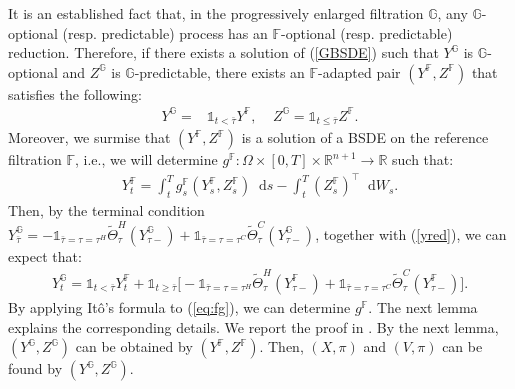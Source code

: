 \documentclass[a4paper, 11pt]{article}              %
\numberwithin{equation}{section}
\theoremstyle{plain}
\newcommand{\btau}{\bar{\tau}}
\newcommand{\1}{\mathds{1}}
\newcommand{\dsF}{\mathbb{F}}
\newcommand{\dsR}{\mathbb{R}}
\newcommand{\dsG}{\mathbb{G}}
\newcommand{\Jt}{\tilde{\Theta}}
\theoremstyle{plain}
\theoremstyle{definition}
\theoremstyle{plain}
\newcommand*\df{\mathop{}\!\mathrm{d}}
\begin{document}
It is an established fact that, in the progressively enlarged filtration $\dsG$, any
$\dsG$-optional (resp. predictable) process has an $\dsF$-optional
(resp. predictable) reduction. Therefore, if there exists a solution of
(\ref{GBSDE}) such that $Y^\dsG$ is $\dsG$-optional and $Z^\dsG$ is
$\dsG$-predictable, there exists an $\dsF$-adapted pair $(Y^\dsF, Z^\dsF)$
that satisfies the following:
\begin{align}
 Y^\dsG =& \1_{t< \btau}Y^\dsF, ~~~~~Z^\dsG = \1_{t \leq \btau}Z^\dsF.\label{yred}  
\end{align}
Moreover, we surmise that $(Y^\dsF, Z^\dsF)$ is a solution of a BSDE on the
reference filtration $\dsF$, i.e., we will determine $g^\dsF \colon \Omega \times [0, T] \times
\dsR^{n+1}\to \dsR$ such that:
\begin{align}
 Y^{\dsF}_t = \int_{t}^{T}g^{\dsF}_s(Y^{\dsF}_s, Z^{\dsF}_s) \df s - \int_{t}^{T}(Z^{\dsF}_s)^{\top}
  \df W_s. \label{FBSDE}
\end{align}
Then, by the terminal condition
$Y^\dsG_{\btau} =
-\1_{\btau=\tau=\tau^H}\Jt^{  H}_{\tau}(Y^{\dsG}_{\tau-})+\1_{\btau=\tau=\tau^C}\Jt^{ C}_{\tau}(Y^{\dsG}_{\tau-})$,
together with (\ref{yred}), 
we can expect that:
\begin{align}
  Y^{\dsG}_t = \1_{t <\btau}Y^{\dsF}_t + \1_{t \geq \btau}
  \big[-\1_{\btau=\tau=\tau^H}\Jt^{ H}_{\tau}(Y^{\dsF}_{\tau-})+\1_{\btau=\tau=\tau^C}\Jt^{ C}_{\tau}(Y^{\dsF}_{\tau-})
  \big]. \label{eq:fg}
\end{align}
By applying It\^o's formula to (\ref{eq:fg}), we can determine 
$g^\dsF$. The next lemma explains the corresponding  details. We report
the proof in . By the next lemma, $(Y^\dsG, Z^\dsG)$ can be
obtained by $(Y^\dsF, Z^\dsF)$. Then, $(X, \pi)$ and $(V, \pi)$ can be found by $(Y^\dsG, Z^\dsG)$.
\end{document}
